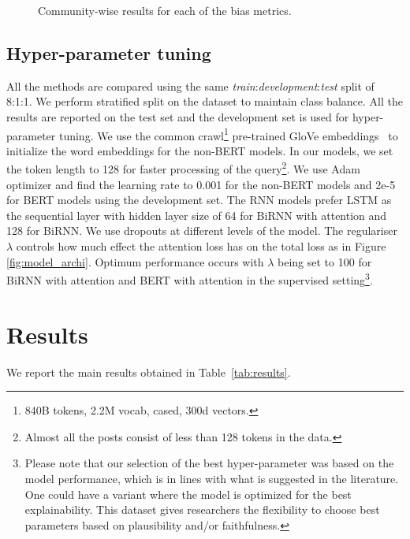 \documentclass[letterpaper]{article} \usepackage{aaai21}  \usepackage{times}  \usepackage{helvet} \usepackage{courier}  \usepackage[hyphens]{url}  \usepackage{graphicx} \urlstyle{rm} \def\UrlFont{\rm}  \usepackage{natbib}  \usepackage{caption}
\begin{document}
\begin{figure*}[!tbh]\centering
    \caption{Community-wise results for each of the bias metrics.}\label{fig:bias_community_wise}\end{figure*}


\subsection{Hyper-parameter tuning}
All the methods are compared using the same \textit{train}:\textit{development}:\textit{test} split of 8:1:1. We perform stratified split on the dataset to maintain class balance. All the results are reported on the test set and the development set is used for hyper-parameter tuning.
We use the common crawl\footnote{840B tokens, 2.2M vocab, cased, 300d vectors.} pre-trained GloVe embeddings~\cite{pennington2014glove} to initialize the word embeddings for the non-BERT models. In our models, we set the token length to 128 for faster processing of the query\footnote{Almost all the posts consist of less than 128 tokens in the data.}. We use Adam~\cite{kingma2014adam} optimizer and find the learning rate to 0.001 for the non-BERT models and 2e-5 for BERT models using the development set. The RNN models prefer LSTM as the sequential layer with hidden layer size of 64 for BiRNN with attention and 128 for BiRNN.  We use dropouts at different levels of the model. The regulariser $\lambda$ controls how much effect the attention loss has on the total loss as in Figure \ref{fig:model_archi}. Optimum performance occurs with $\lambda$ being set to 100 for BiRNN with attention and BERT with attention in the supervised setting\footnote{Please note that our selection of the best hyper-parameter was based on the model performance, which is in lines with what is suggested in the literature. One could have a variant where the model is optimized for the best explainability. This dataset gives researchers the flexibility to choose best parameters based on plausibility and/or faithfulness.}.




\section{Results}
 We report the main results obtained in Table~\ref{tab:results}.
\end{document}
